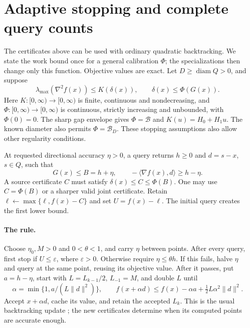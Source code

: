 \section{Adaptive stopping and complete query counts}
\label{nloracle:section}
The certificates above can be used with ordinary quadratic backtracking.
We state the work bound once for a general calibration $\Phi$; the
specializations then change only this function. Objective values are exact.
Let $D\ge\operatorname{diam}Q>0$, and suppose
\begin{equation}\label{nloracle:model}
 \lambda_{\max}(\nabla^2f(x))\le K(\delta(x)),\qquad
 \delta(x)\le\Phi(G(x)).
\end{equation}
Here $K:[0,\infty)\to[0,\infty)$ is finite, continuous and nondecreasing,
and $\Phi:[0,\infty)\to[0,\infty)$ is continuous,
strictly increasing and unbounded, with $\Phi(0)=0$.
The sharp gap envelope gives $\Phi=\mathcal B$ and $K(u)=H_0+H_1u$.
The known diameter also permits $\Phi=\mathcal B_D$.
These stopping assumptions also allow other regularity conditions.

At requested directional accuracy $\eta>0$, a query returns $h\ge0$
and $d=s-x$, $s\in Q$, such that
\begin{equation}\label{nloracle:query}
 G(x)\le B=h+\eta,\qquad
 -\langle\nabla f(x),d\rangle\ge h-\eta.
\end{equation}
A source certificate $C$ must satisfy $\delta(x)\le C\le\Phi(B)$.
One may use $C=\Phi(B)$ or a sharper valid joint certificate.
Retain $\ell\leftarrow\max\{\ell,f(x)-C\}$ and set $U=f(x)-\ell$.
The initial query creates the first lower bound.

\paragraph{The rule.}
Choose $\eta_0,M>0$ and $0<\theta<1$, and carry $\eta$ between points.
After every query, first stop if $U\le\varepsilon$, where $\varepsilon>0$.
Otherwise require $\eta\le\theta h$. If this fails, halve $\eta$ and
query at the same point, reusing its objective value.
After it passes, put $a=h-\eta$, start with $L=L_{k-1}/2$,
$L_{-1}=M$, and double $L$ until
\begin{equation}\label{eq:btstep}
 \alpha=\min\{1,a/(L\|d\|^2)\},\qquad
 f(x+\alpha d)\le f(x)-\alpha a+\tfrac12L\alpha^2\|d\|^2.
\end{equation}
Accept $x+\alpha d$, cache its value, and retain the accepted $L_k$.
This is the usual backtracking update \cite{pedregosa}; the new
certificates determine when its computed points are accurate enough.

